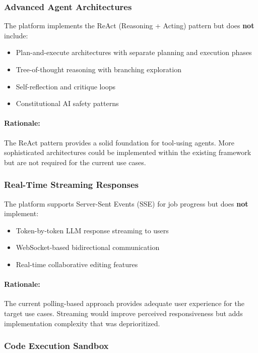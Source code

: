 \subsubsection{Advanced Agent Architectures}

The platform implements the ReAct (Reasoning + Acting) pattern but does \textbf{not} include:

\begin{itemize}
    \item Plan-and-execute architectures with separate planning and execution phases
    \item Tree-of-thought reasoning with branching exploration
    \item Self-reflection and critique loops
    \item Constitutional AI safety patterns
\end{itemize}

\paragraph{Rationale:} The ReAct pattern provides a solid foundation for tool-using agents. More sophisticated architectures could be implemented within the existing framework but are not required for the current use cases.

\subsubsection{Real-Time Streaming Responses}

The platform supports Server-Sent Events (SSE) for job progress but does \textbf{not} implement:

\begin{itemize}
    \item Token-by-token LLM response streaming to users
    \item WebSocket-based bidirectional communication
    \item Real-time collaborative editing features
\end{itemize}

\paragraph{Rationale:} The current polling-based approach provides adequate user experience for the target use cases. Streaming would improve perceived responsiveness but adds implementation complexity that was deprioritized.

\subsubsection{Code Execution Sandbox}

